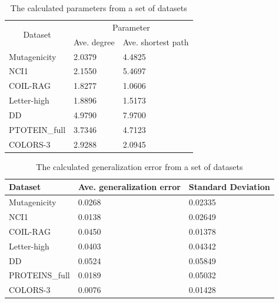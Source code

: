 \documentclass{article}
\begin{document}
\begin{table}[h!]
    \centering
    \begin{tabular}{@{}lll@{}}
    \toprule
    \multicolumn{1}{c}{\multirow{2}{*}{Dataset}} & \multicolumn{2}{c}{Parameter}                                            \\ \cmidrule(l){2-3} 
    \multicolumn{1}{c}{}                         & \multicolumn{1}{c}{Ave. degree} & \multicolumn{1}{c}{Ave. shortest path} \\ \midrule
    Mutagenicity                                 & 2.0379         & 4.4825                     \\
    NCI1                                         & 2.1550         & 5.4697                     \\
    COIL-RAG                                     & 1.8277         & 1.0606                     \\
    Letter-high                                  & 1.8896         & 1.5173                     \\
    DD                                           & 4.9790         & 7.9700                     \\
    PTOTEIN\_full                                & 3.7346         & 4.7123                     \\
    COLORS-3                                     & 2.9288         & 2.0945                     \\ \bottomrule
    \end{tabular}
    \caption{The calculated parameters from a set of datasets}
    \label{tab:parameter}
\end{table}

\begin{table}[h!]
    \centering
    \begin{tabular}{@{}lll@{}}
    \toprule
    Dataset        & Ave. generalization error & Standard Deviation   \\ \midrule
    Mutagenicity   & 0.0268      & 0.02335 \\
    NCI1           & 0.0138      & 0.02649 \\
    COIL-RAG       & 0.0450      & 0.01378 \\
    Letter-high    & 0.0403      & 0.04342 \\
    DD             & 0.0524      & 0.05849 \\
    PROTEINS\_full & 0.0189      & 0.05032 \\
    COLORS-3       & 0.0076      & 0.01428 \\ \bottomrule
    \end{tabular}
    \caption{The calculated generalization error from a set of datasets}
    \label{tab:error}
\end{table}
\end{document}
